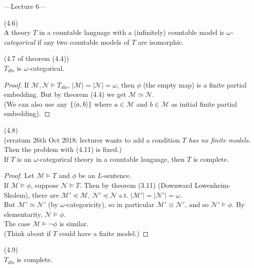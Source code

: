 \documentclass[a4paper]{article}
\begin{document}
---Lecture 6---

\begin{defi} (4.6)\\
    A theory $T$ in a countable language with a (infinitely) countable model is \emph{$\omega$-categorical} if any two countable models of $T$ are isomorphic.
\end{defi}

\begin{coro} (4.7 of theorem (4.4))\\
    $T_{dlo}$ is $\omega$-categorical.
    \begin{proof}
        If $\mathcal{M}, \mathcal{N} \vDash T_{dlo}$, $|\mathcal{M}| = |\mathcal{N}| = \omega$, then $\phi$ (the empty map) is a finite partial embedding. But by theorem (4.4) we get $\mathcal{M} \simeq \mathcal{N}$.\\
        (We can also use any $\{\langle a,b\rangle\}$ where $a \in \mathcal{M}$ and $b \in \mathcal{M}$ as initial finite partial embedding).
    \end{proof}
\end{coro}

\begin{thm} (4.8)\\
    (erratum 26th Oct 2018: lecturer wants to add a condition \emph{$T$ has no finite models}. Then the problem with (4.11) is fixed.)\\
    If $T$ is an $\omega$-categorical theory in a countable language, then $T$ is complete.
    \begin{proof}
        Let $\mathcal{M} \vDash T$ and $\phi$ be an $L$-sentence.\\
        If $\mathcal{M} \vDash \phi$, suppose $\mathcal{N} \vDash T$. Then by theorem (3.11) (Downward Lowenheim-Skolem), there are $\mathcal{M}' \preccurlyeq \mathcal{M}$, $\mathcal{N}' \preccurlyeq\mathcal{N}$ s.t. $|\mathcal{M}'| = |\mathcal{N}'| = \omega$.\\
        But $\mathcal{M}' \simeq \mathcal{N}'$ (by $\omega$-categoricity), so in particular $\mathcal{M}' \equiv \mathcal{N}'$, and so $\mathcal{N}' \vDash \phi$. By elementarity, $\mathcal{N} \vDash \phi$.\\
        The case $\mathcal{M} \vDash \neg\phi$ is similar.\\
        (Think about if $T$ could have a finite model.)
    \end{proof}
\end{thm}

\begin{coro} (4.9)\\
    $T_{dlo}$ is complete.
\end{coro}
\end{document}
